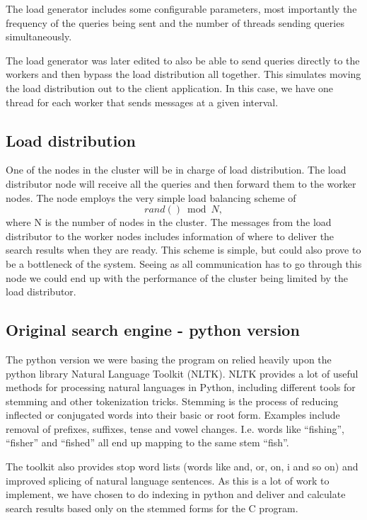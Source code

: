 The load generator includes some configurable parameters, most importantly the frequency of the queries being sent and the number of threads sending queries simultaneously.

The load generator was later edited to also be able to send queries directly to the workers and then bypass the load distribution all together. This simulates moving the load distribution out to the client application. In this case, we have one thread for each worker that sends messages at a given interval.

\subsection{Load distribution}
One of the nodes in the cluster will be in charge of load distribution. The load distributor node will receive all the queries and then forward them to the worker nodes.
The node employs the very simple load balancing scheme of $$rand() \bmod N,$$ where N is the number of nodes in the cluster.
The messages from the load distributor to the worker nodes includes information of where to deliver the search results when they are ready.
This scheme is simple, but could also prove to be a bottleneck of the system. Seeing as all communication has to go through this node we could end up with the performance of the cluster being limited by the load distributor.

\subsection{Original search engine - python version}
The python version we were basing the program on relied heavily upon the python library Natural Language Toolkit\cite{nltk} (NLTK).
NLTK provides a lot of useful methods for processing natural languages in Python, including different tools for stemming and other tokenization tricks.
Stemming is the process of reducing inflected or conjugated words into their basic or root form. Examples include removal of prefixes, suffixes, tense and vowel changes. I.e. words like ``fishing'', ``fisher'' and ``fished'' all end up mapping to the same stem ``fish''.

The toolkit also provides stop word lists (words like and, or, on, i and so on) and improved splicing of natural language sentences. As this is a lot of work to implement, we have chosen to do indexing in python and deliver and calculate search results based only on the stemmed forms for the C program.

